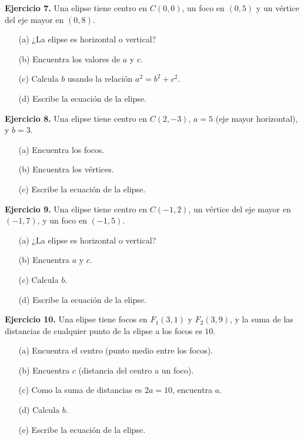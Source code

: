 \documentclass[12pt,a4paper]{article}
\begin{document}
	\bigskip

	\textbf{Ejercicio 7.} Una elipse tiene centro en $C(0,0)$, un foco en $(0,5)$ y un vértice del eje mayor en $(0,8)$.
	\begin{itemize}
		\item[(a)] ¿La elipse es horizontal o vertical?
		\item[(b)] Encuentra los valores de $a$ y $c$.
		\item[(c)] Calcula $b$ usando la relación $a^2=b^2+c^2$.
		\item[(d)] Escribe la ecuación de la elipse.
	\end{itemize}

	\bigskip

	\textbf{Ejercicio 8.} Una elipse tiene centro en $C(2,-3)$, $a=5$ (eje mayor horizontal), y $b=3$.
	\begin{itemize}
		\item[(a)] Encuentra los focos.
		\item[(b)] Encuentra los vértices.
		\item[(c)] Escribe la ecuación de la elipse.
	\end{itemize}

	\bigskip

	\textbf{Ejercicio 9.} Una elipse tiene centro en $C(-1,2)$, un vértice del eje mayor en $(-1,7)$, y un foco en $(-1,5)$.
	\begin{itemize}
		\item[(a)] ¿La elipse es horizontal o vertical?
		\item[(b)] Encuentra $a$ y $c$.
		\item[(c)] Calcula $b$.
		\item[(d)] Escribe la ecuación de la elipse.
	\end{itemize}

	\bigskip

	\textbf{Ejercicio 10.} Una elipse tiene focos en $F_1(3,1)$ y $F_2(3,9)$, y la suma de las distancias de cualquier punto de la elipse a los focos es $10$.
	\begin{itemize}
		\item[(a)] Encuentra el centro (punto medio entre los focos).
		\item[(b)] Encuentra $c$ (distancia del centro a un foco).
		\item[(c)] Como la suma de distancias es $2a=10$, encuentra $a$.
		\item[(d)] Calcula $b$.
		\item[(e)] Escribe la ecuación de la elipse.
	\end{itemize}
\end{document}
